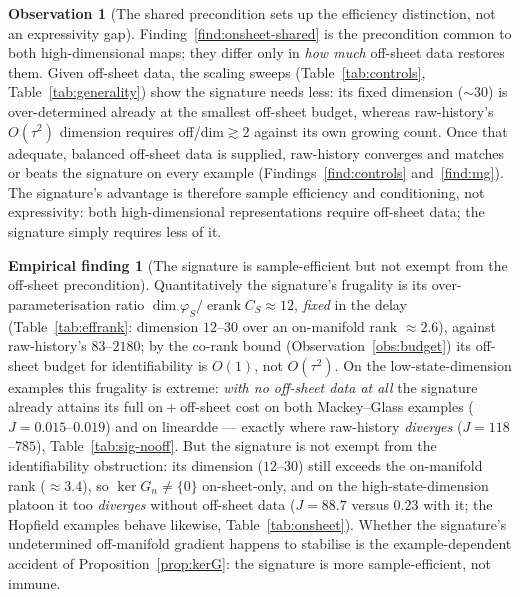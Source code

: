 \documentclass[11pt]{article}
\renewcommand{\_}{\discretionary{\textunderscore}{}{\textunderscore}}
\theoremstyle{plain}
\theoremstyle{definition}
\newtheorem{finding}[theorem]{Empirical finding}
\newtheorem{observation}[theorem]{Observation}
\newcommand{\effrank}{\operatorname{erank}}
\begin{document}
\begin{observation}[The shared precondition sets up the efficiency distinction, not an expressivity gap]\label{obs:precond}
Finding~\ref{find:onsheet-shared} is the precondition common to both high-dimensional maps; they
differ only in \emph{how much} off-sheet data restores them. Given off-sheet data, the scaling
sweeps (Table~\ref{tab:controls}, Table~\ref{tab:generality}) show the signature needs less: its
fixed dimension ($\sim30$) is over-determined already at the smallest off-sheet budget, whereas
raw-history's $O(\tau^{2})$ dimension requires off/dim${}\gtrsim2$ against its own growing count.
Once that adequate, balanced off-sheet data is supplied, raw-history converges and matches or beats
the signature on every example (Findings~\ref{find:controls} and~\ref{find:mg}). The signature's
advantage is therefore sample efficiency and conditioning, not expressivity: both high-dimensional
representations require off-sheet data; the signature simply requires less of it.
\end{observation}

\begin{finding}[The signature is sample-efficient but not exempt from the off-sheet precondition]\label{find:sig-nooff}
Quantitatively the signature's frugality is its over-parameterisation ratio
$\dim\varphi_S/\effrank C_S\approx12$, \emph{fixed} in the delay (Table~\ref{tab:effrank}: dimension
$12$--$30$ over an on-manifold rank $\approx2.6$), against raw-history's $83$--$2180$; by the co-rank
bound (Observation~\ref{obs:budget}) its off-sheet budget for identifiability is $O(1)$, not
$O(\tau^{2})$. On the low-state-dimension examples this frugality is extreme: \emph{with no off-sheet
data at all} the signature already attains its full on${}+{}$off-sheet cost on both Mackey--Glass
examples ($J=0.015$--$0.019$) and on linear\_dde --- exactly where raw-history \emph{diverges}
($J=118$--$785$), Table~\ref{tab:sig-nooff}. But the signature is not exempt from the identifiability
obstruction: its dimension ($12$--$30$) still exceeds the on-manifold rank ($\approx3.4$), so
$\ker G_{n}\ne\{0\}$ on-sheet-only, and on the high-state-dimension platoon it too \emph{diverges}
without off-sheet data ($J=88.7$ versus $0.23$ with it; the Hopfield examples behave likewise,
Table~\ref{tab:onsheet}). Whether the signature's undetermined off-manifold gradient happens to
stabilise is the example-dependent accident of Proposition~\ref{prop:kerG}: the signature is more
sample-efficient, not immune.
\end{finding}
\end{document}
